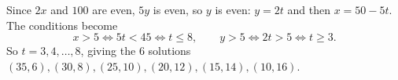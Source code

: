 Since $2x$ and $100$ are even, $5y$ is even, so $y$ is even: $y=2t$ and then $x=50-5t$. The conditions become
\[
x>5\iff 5t<45\iff t\le8,\qquad y>5\iff 2t>5\iff t\ge3 .
\]
So $t=3,4,\dots,8$, giving the $\boxed{6}$ solutions $(35,6),(30,8),(25,10),(20,12),(15,14),(10,16)$.
